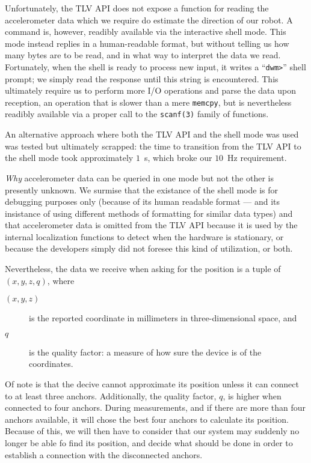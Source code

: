 Unfortunately, the TLV API does not expose a function for reading the accelerometer data which we require do estimate the direction of our robot.
A command is, however, readibly available via the interactive shell mode.
This mode instead replies in a human-readable format, but without telling us how many bytes are to be read, and in what way to interpret the data we read.
Fortunately, when the shell is ready to process new input, it writes a ``\texttt{dwm>}'' shell prompt;
we simply read the response until this string is encountered.
This ultimately require us to perform more I/O operations and parse the data upon reception, an operation that is slower than a mere \texttt{memcpy},
but is nevertheless readibly available via a proper call to the \texttt{scanf(3)} family of functions.

An alternative approach where both the TLV API and the shell mode was used was tested but ultimately scrapped:
the time to transition from the TLV API to the shell mode took approximately $1$~s, which broke our $10$~Hz requirement.

\textit{Why} accelerometer data can be queried in one mode but not the other is presently unknown.
We surmise that the existance of the shell mode is for debugging purposes only (because of its human readable format --- and its insistance of using different methods of formatting for similar data types) and that accelerometer data is omitted from the TLV API because it is used by the internal localization functions to detect when the hardware is stationary, or because the developers simply did not foresee this kind of utilization, or both.

Nevertheless, the data we receive when asking for the position is a tuple of
$(x, y, z, q)$, where
\begin{description}
\item[$(x, y, z)$] is the reported coordinate in millimeters in three-dimensional space, and
\item[$q$] is the quality factor: a measure of how sure the device is of the coordinates.
\end{description}

Of note is that the decive cannot approximate its position unless it can connect to at least three anchors.
Additionally, the quality factor, $q$, is higher when connected to four anchors.
During measurements, and if there are more than four anchors available, it will chose the best four anchors to calculate its position. %
Because of this, we will then have to consider that our system may suddenly no longer be able fo find its position,
and decide what should be done in order to establish a connection with the disconnected anchors.

